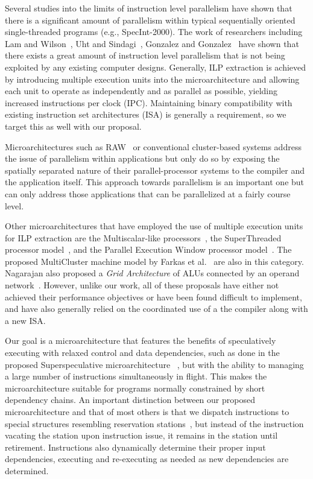 \documentclass[10pt,twocolumn,dvips]{article}
\begin{document}
Several studies into the limits of instruction level 
parallelism have shown that there is 
a significant amount of parallelism within
typical sequentially oriented single-threaded programs
(e.g., SpecInt-2000).  
The work of researchers including 
Lam and Wilson~\cite{Lam92},
Uht and Sindagi~\cite{Uht95},
Gonzalez and Gonzalez~\cite{Gon97}
have shown that there exists a great amount of instruction level
parallelism that is not being exploited by any existing
computer designs.
Generally, ILP extraction is achieved by introducing multiple
execution units into the microarchitecture and allowing each unit
to operate as independently and as parallel as possible, yielding
increased instructions per clock (IPC).
Maintaining binary compatibility with existing instruction
set architectures (ISA) is generally a requirement, so we
target this as well with our proposal.

Microarchitectures such as RAW~\cite{waingold97,taylor02}
or conventional cluster-based systems
address the issue of parallelism within applications but only do so
by exposing the spatially separated nature of their
parallel-processor systems to the compiler and the application itself.
This approach towards parallelism is an important one but
can only address those applications that can be parallelized at
a fairly course level.

Other microarchitectures that have employed the
use of multiple execution units for ILP extraction are the Multiscalar-like
processors~\cite{Sohi95,sundararaman97multiscalar},
the SuperThreaded processor model~\cite{tsai96superthread},
and
the Parallel Execution Window processor model~\cite{kemp96pew}.
The proposed MultiCluster machine model by 
Farkas et al.~\cite{farkas97multicluster} are also in this category.
Nagarajan also proposed a {\em Grid Architecture} of ALUs
connected by an operand network~\cite{Nag01}.  
However, unlike our work, all of these proposals have either
not achieved their performance objectives or have been found
difficult to implement, and have also generally relied on the
coordinated use of a the compiler along with a new ISA.

Our goal is a microarchitecture
that features the benefits of speculatively executing with 
relaxed control and data dependencies,
such as done in the proposed Superspeculative 
microarchitecture ~\cite{Lip97}, but with the ability
to managing a large number of instructions simultaneously in flight.
This makes the microarchitecture
suitable for programs normally constrained by short dependency chains.
An important distinction between our proposed microarchitecture and
that of most others is that we dispatch instructions to special structures
resembling reservation stations~\cite{Anderson67,Tom67},
but instead of the instruction
vacating the station upon instruction issue, it
remains in the station until retirement.
Instructions also
dynamically determine their proper input dependencies,
executing and re-executing as needed as new dependencies
are determined.
\end{document}
